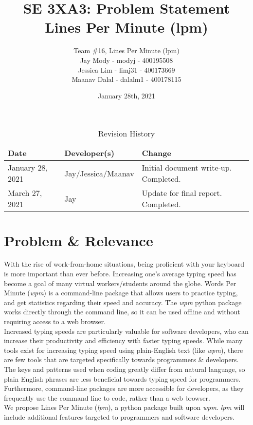 \documentclass{article}
\title{SE 3XA3: Problem Statement\\Lines Per Minute (lpm)}
\author{Team \#16, Lines Per Minute (lpm) \\
Jay Mody - modyj - 400195508\\
Jessica Lim - limj31 - 400173669\\
Maanav Dalal - dalalm1 - 400178115\\
}
\date{January 28th, 2021}
\begin{document}
\maketitle

\begin{table}[hp]
\caption{Revision History} \label{TblRevisionHistory}
\begin{tabularx}{\textwidth}{llX}
\toprule
\textbf{Date} & \textbf{Developer(s)} & \textbf{Change}\\
\midrule
January 28, 2021 & Jay/Jessica/Maanav & Initial document write-up. Completed.\\
March 27, 2021 & Jay & Update for final report. Completed.\\
\bottomrule
\end{tabularx}
\end{table}


\newpage

\section*{Problem \& Relevance}
With the rise of work-from-home situations, being proficient with your keyboard is more important than ever before. Increasing one's average typing speed has become a goal of many virtual workers/students around the globe. Words Per Minute (\textit{wpm}) is a command-line package that allows users to practice typing, and get statistics regarding their speed and accuracy. The \textit{wpm} python package works directly through the command line, so it can be used offline and without requiring access to a web browser. \\

Increased typing speeds are particularly valuable for software developers, who can increase their productivity and efficiency with faster typing speeds. While many tools exist for increasing typing speed using plain-English text (like \textit{wpm}), there are few tools that are targeted specifically towards programmers \& developers. The keys and patterns used when coding greatly differ from natural language, so plain English phrases are less beneficial towards typing speed for programmers. Furthermore, command-line packages are more accessible for developers, as they frequently use the command line to code, rather than a web browser. \\

We propose Lines Per Minute (\textit{lpm}), a python package built upon \textit{wpm}. \textit{lpm} will include additional features targeted to programmers and software developers.
\end{document}
